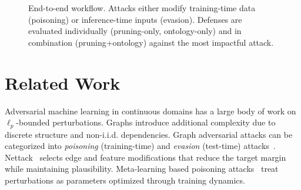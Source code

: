 \documentclass[conference]{IEEEtran}
\begin{document}
\begin{figure}[t]
\centering
{}%
\caption{End-to-end workflow. Attacks either modify training-time data (poisoning) or inference-time inputs (evasion). Defenses are evaluated individually (pruning-only, ontology-only) and in combination (pruning+ontology) against the most impactful attack.}
\label{fig:workflow}
\end{figure}

\section{Related Work}
Adversarial machine learning in continuous domains has a large body of work on $\ell_p$-bounded perturbations. Graphs introduce additional complexity due to discrete structure and non-i.i.d. dependencies. Graph adversarial attacks can be categorized into \textit{poisoning} (training-time) and \textit{evasion} (test-time) attacks~\cite{zugner2018nettack,zugner2019metattack}. Nettack~\cite{zugner2018nettack} selects edge and feature modifications that reduce the target margin while maintaining plausibility. Meta-learning based poisoning attacks~\cite{zugner2019metattack} treat perturbations as parameters optimized through training dynamics.
\end{document}

